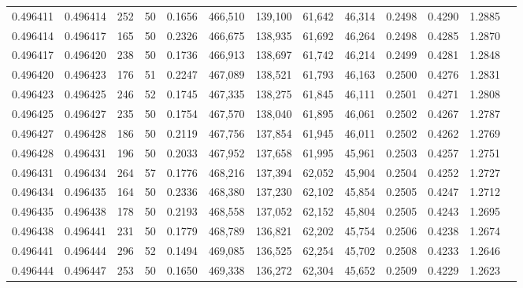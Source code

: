 \begin{tabular}{rrrrrrrrrrrrr}
0.496411 & 0.496414 &   252 &  50 &                                     0.1656 & 466,510 & 139,100 &  61,642 &  46,314 & 0.2498 & 0.4290 & 1.2885 \\
0.496414 & 0.496417 &   165 &  50 &                                     0.2326 & 466,675 & 138,935 &  61,692 &  46,264 & 0.2498 & 0.4285 & 1.2870 \\
0.496417 & 0.496420 &   238 &  50 &                                     0.1736 & 466,913 & 138,697 &  61,742 &  46,214 & 0.2499 & 0.4281 & 1.2848 \\
0.496420 & 0.496423 &   176 &  51 &                                     0.2247 & 467,089 & 138,521 &  61,793 &  46,163 & 0.2500 & 0.4276 & 1.2831 \\
0.496423 & 0.496425 &   246 &  52 &                                     0.1745 & 467,335 & 138,275 &  61,845 &  46,111 & 0.2501 & 0.4271 & 1.2808 \\
0.496425 & 0.496427 &   235 &  50 &                                     0.1754 & 467,570 & 138,040 &  61,895 &  46,061 & 0.2502 & 0.4267 & 1.2787 \\
0.496427 & 0.496428 &   186 &  50 &                                     0.2119 & 467,756 & 137,854 &  61,945 &  46,011 & 0.2502 & 0.4262 & 1.2769 \\
0.496428 & 0.496431 &   196 &  50 &                                     0.2033 & 467,952 & 137,658 &  61,995 &  45,961 & 0.2503 & 0.4257 & 1.2751 \\
0.496431 & 0.496434 &   264 &  57 &                                     0.1776 & 468,216 & 137,394 &  62,052 &  45,904 & 0.2504 & 0.4252 & 1.2727 \\
0.496434 & 0.496435 &   164 &  50 &                                     0.2336 & 468,380 & 137,230 &  62,102 &  45,854 & 0.2505 & 0.4247 & 1.2712 \\
0.496435 & 0.496438 &   178 &  50 &                                     0.2193 & 468,558 & 137,052 &  62,152 &  45,804 & 0.2505 & 0.4243 & 1.2695 \\
0.496438 & 0.496441 &   231 &  50 &                                     0.1779 & 468,789 & 136,821 &  62,202 &  45,754 & 0.2506 & 0.4238 & 1.2674 \\
0.496441 & 0.496444 &   296 &  52 &                                     0.1494 & 469,085 & 136,525 &  62,254 &  45,702 & 0.2508 & 0.4233 & 1.2646 \\
0.496444 & 0.496447 &   253 &  50 &                                     0.1650 & 469,338 & 136,272 &  62,304 &  45,652 & 0.2509 & 0.4229 & 1.2623 \\

\end{tabular}

